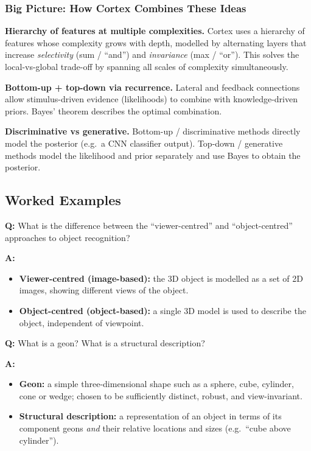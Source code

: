 \bigseparator

\subsubsection{Big Picture: How Cortex Combines These Ideas}

\textbf{Hierarchy of features at multiple complexities.} Cortex uses a hierarchy of features whose complexity grows with depth, modelled by alternating layers that increase \emph{selectivity} (sum / ``and'') and \emph{invariance} (max / ``or''). This solves the local-vs-global trade-off by spanning all scales of complexity simultaneously.

\textbf{Bottom-up + top-down via recurrence.} Lateral and feedback connections allow stimulus-driven evidence (likelihoods) to combine with knowledge-driven priors. Bayes' theorem describes the optimal combination.

\textbf{Discriminative vs generative.} Bottom-up / discriminative methods directly model the posterior (e.g.\ a CNN classifier output). Top-down / generative methods model the likelihood and prior separately and use Bayes to obtain the posterior.

\bigseparator

\subsection{Worked Examples}

\begin{exbox}
\textbf{Q:} What is the difference between the ``viewer-centred'' and ``object-centred'' approaches to object recognition?

\textbf{A:}
\begin{itemize}
  \item \textbf{Viewer-centred (image-based):} the 3D object is modelled as a set of 2D images, showing different views of the object.
  \item \textbf{Object-centred (object-based):} a single 3D model is used to describe the object, independent of viewpoint.
\end{itemize}
\end{exbox}

\begin{exbox}
\textbf{Q:} What is a geon? What is a structural description?

\textbf{A:}
\begin{itemize}
  \item \textbf{Geon:} a simple three-dimensional shape such as a sphere, cube, cylinder, cone or wedge; chosen to be sufficiently distinct, robust, and view-invariant.
  \item \textbf{Structural description:} a representation of an object in terms of its component geons \emph{and} their relative locations and sizes (e.g.\ ``cube above cylinder'').
\end{itemize}
\end{exbox}

